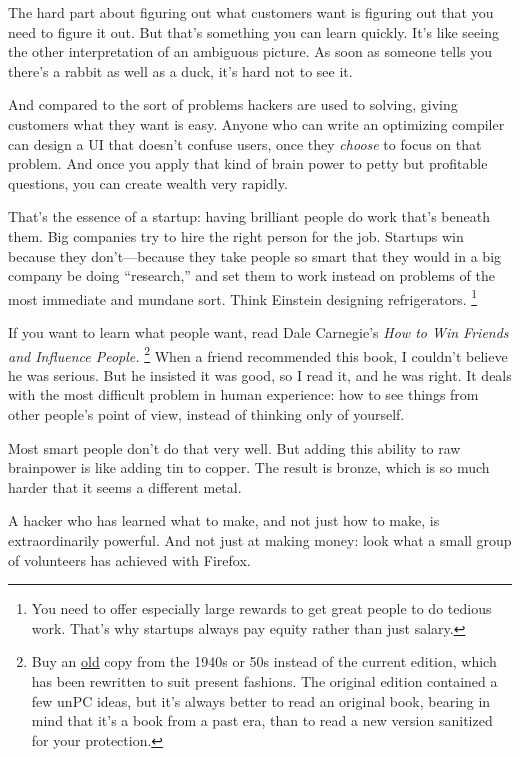 The hard part about figuring out what customers want is figuring out
that you need to figure it out. But that's something you can learn
quickly. It's like seeing the other interpretation of an ambiguous
picture. As soon as someone tells you there's a rabbit as well as a
duck, it's hard not to see it.

And compared to the sort of problems hackers are used to solving, giving
customers what they want is easy. Anyone who can write an optimizing
compiler can design a UI that doesn't confuse users, once they
\emph{choose} to focus on that problem. And once you apply that kind of
brain power to petty but profitable questions, you can create wealth
very rapidly.

That's the essence of a startup: having brilliant people do work that's
beneath them. Big companies try to hire the right person for the job.
Startups win because they don't---because they take people so smart that
they would in a big company be doing ``research,'' and set them to work
instead on problems of the most immediate and mundane sort. Think
Einstein designing refrigerators. \footnote{You need to offer especially large rewards to get great people
to do tedious work. That's why startups always pay equity rather than
just salary.}

If you want to learn what people want, read Dale Carnegie's \emph{How to
Win Friends and Influence People.} \footnote{Buy an
\href{http://dogbert.abebooks.com/servlet/SearchResults?bx=on&sts=t&ds=30&bi=0&an=carnegie&kn=1938+OR+1939+OR+1940+OR+1941+OR+1942+OR+1943+OR+1944+OR+1945+OR+1946+OR+1947+OR+1948&tn=influence+friends&sortby=2}{old}
copy from the 1940s or 50s instead of the current edition, which has
been rewritten to suit present fashions. The original edition contained
a few unPC ideas, but it's always better to read an original book,
bearing in mind that it's a book from a past era, than to read a new
version sanitized for your protection.} When a friend
recommended this book, I couldn't believe he was serious. But he
insisted it was good, so I read it, and he was right. It deals with the
most difficult problem in human experience: how to see things from other
people's point of view, instead of thinking only of yourself.

Most smart people don't do that very well. But adding this ability to
raw brainpower is like adding tin to copper. The result is bronze, which
is so much harder that it seems a different metal.

A hacker who has learned what to make, and not just how to make, is
extraordinarily powerful. And not just at making money: look what a
small group of volunteers has achieved with Firefox.

